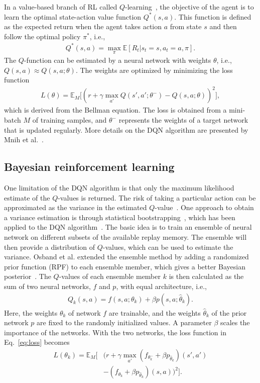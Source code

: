 In a value-based branch of RL called $Q$-learning~\cite{Watkins1992}, the objective of the agent is to learn the optimal state-action value function $Q^*(s,a)$. This function is defined as the expected return when the agent takes action $a$ from state $s$ and then follow the optimal policy $\pi^*$, i.e.,
%
\begin{align}
	Q^*(s,a) = \max_\pi \mathbb{E} \left[R_t | s_t = s, a_t = a, \pi\right].
\end{align}
%
The $Q$-function can be estimated by a neural network with weights $\theta$, i.e., $Q(s,a) \approx Q(s,a;\theta)$. The weights are optimized by minimizing the loss function
\begin{align}
	L(\theta) = \mathbb{E}_M \Big[ (r + \gamma \max_{a'} Q(s',a';\theta^-)
	- Q(s,a;\theta) )^2 \Big],
	\label{eq:loss}
\end{align}
%
which is derived from the Bellman equation. The loss is obtained from a mini-batch $M$ of training samples, and $\theta^-$ represents the weights of a target network that is updated regularly. More details on the DQN algorithm are presented by Mnih et al.~\cite{Mnih2015}.


\subsection{Bayesian reinforcement learning}

One limitation of the DQN algorithm is that only the maximum likelihood estimate of the $Q$-values is returned. The risk of taking a particular action can be approximated as the variance in the estimated $Q$-value~\cite{Garcia2015}. One approach to obtain a variance estimation is through statistical bootstrapping~\cite{Efron1982}, which has been applied to the DQN algorithm~\cite{Osband2016}. The basic idea is to train an ensemble of neural network on different subsets of the available replay memory. The ensemble will then provide a distribution of $Q$-values, which can be used to estimate the variance. Osband et al. extended the ensemble method by adding a randomized prior function (RPF) to each ensemble member, which gives a better Bayesian posterior~\cite{Osband2018}. The $Q$-values of each ensemble member $k$ is then calculated as the sum of two neural networks, $f$ and $p$, with equal architecture, i.e.,
%
\begin{align}
	Q_k(s,a) = f(s,a;\theta_k) + \beta p(s,a;\hat{\theta}_k).
\end{align}
%
Here, the weights $\theta_k$ of network $f$ are trainable, and the weights $\hat{\theta}_k$ of the prior network $p$ are fixed to the randomly initialized values. A parameter $\beta$ scales the importance of the networks. With the two networks, the loss function in Eq.~\ref{eq:loss} becomes
%
\begin{align}
	\label{eq:loss_boot}
	L(\theta_k) = \mathbb{E}_M \Big[ & (r + \gamma \max_{a'} (f_{\theta^-_k}+\beta p_{\hat{\theta}_k})(s',a') \nonumber \\
	& - (f_{\theta_k}+ \beta p_{\hat{\theta}_k})(s,a) )^2 \Big].
\end{align} 

